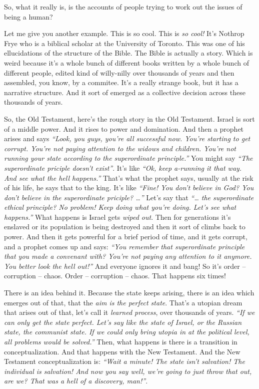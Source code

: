 \documentclass{memoir}
\newcommand{\qq}[1]{\emph{“#1”}}
\begin{document}
\begin{drama}
\jrspeaks So, what it really is, is the accounts of people trying to work out the issues of being a human?

		\jpspeaks Let me give you another example. This is so cool. This is \emph{so cool!} It’s Nothrop Frye who is a biblical scholar at the University of Toronto. This was one of his ellucidations of the structure of the Bible. The Bible is actually a story. Which is weird because it’s a whole bunch of different books written by a whole bunch of different people, edited kind of willy-nilly over thousands of years and then assembled, you know, by a commitee. It’s a really strange book, but it has a narrative structure. And it sort of emerged as a collective decision across these thousands of years.

		So, the Old Testament, here’s the rough story in the Old Testament. Israel is sort of a middle power. And it rises to power and domination. And then a prophet arises and says \qq{Look, you guys, you’re all successful now. You’re starting to get corrupt. You’re not paying attention to the widows and children. You’re not running your state according to the superordinate principle.} You might say \qq{The superordinate priciple doesn’t exist}. It’s like \qq{Ok, keep a-running it that way. And see what the hell happens.} That’s what the prophet says, usually at the risk of his life, he says that to the king. It’s like \qq{Fine! You don’t believe in God? You don’t believe in the superordinate priciple? \ldots{}} Let’s say that \qq{\ldots{} the superordinate ethical principle? No problem! Keep doing what you’re doing. Let’s see what happens.} What happens is Israel gets \emph{wiped out}. Then for generations it’s enslaved or its population is being destroyed and then it sort of climbs back to power. And then it gets powerful for a brief period of time, and it gets corrupt, and a prophet comes up and says: \qq{You remember that superordinate principle that you made a convenant with? You’re not paying any attention to it anymore. You better look the hell out!} And everyone ignores it and bang! So it’s order -- corruption -- chaos. Order -- corruption -- chaos. That happens six times!

There is an idea behind it. Because the state keeps arising, there is an idea which emerges out of that, that the \emph{aim is the perfect state}. That’s a utopian dream that arises out of that, let’s call it \emph{learned process}, over thousands of years. \qq{If we can only get the state perfect. Let’s say like the state of Israel, or the Russian state, the communist state. If we could only bring utopia in at the political level, all problems would be solved.} Then, what happens is there is a transition in conceptualization. And that happens with the New Testament. And the New Testament conceptualization is: \qq{Wait a minute! The state isn’t salvation! The individual is salvation! And now you say well, we’re going to just throw that out, are we? That was a hell of a discovery, man!}.


\end{drama}
\end{document}
